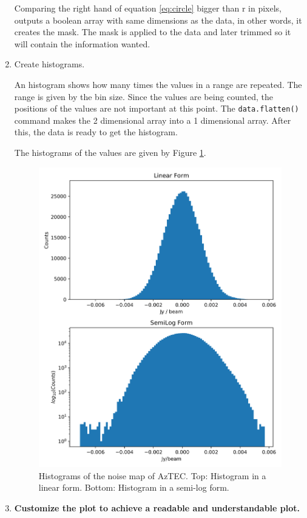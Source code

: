 \begin{enumerate}
    Comparing the right hand of equation \ref{eq:circle} bigger than r in pixels, outputs a boolean array with same dimensions as the data, in other words, it creates the mask. The mask is applied to the data and later trimmed so it will contain the information wanted. 
    
    \item Create histograms.
    
    An histogram shows how many times the values in a range are repeated. The range is given by the bin size. Since the values are being counted, the positions of the values are not important at this point. The \lstinline[columns=fixed, style=Python]{data.flatten()} command makes the 2 dimensional array into a 1 dimensional array. After this, the data is ready to get the histogram. 
    
    The histograms of the values are given by Figure \ref{fig:histograms}. 
    
    \begin{figure}[]
        \centering
        \includegraphics{figures/hw01prob1-2fig1.png}
        \caption{Histograms of the noise map of AzTEC. Top: Histogram in a linear form. Bottom: Histogram in a semi-log form.}
        \label{fig:histograms}
    \end{figure}
    
     \item \textbf{Customize the plot to achieve a readable and understandable plot.}
     
\end{enumerate}

